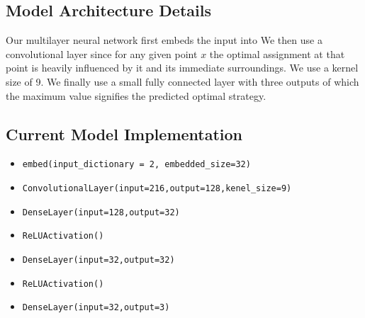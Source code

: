 \documentclass[12pt]{article}
\begin{document}
 \subsection{Model Architecture Details}
 Our multilayer neural network first embeds the input into
 We then use a convolutional layer since for any given point $x$ the optimal assignment at that point is heavily influenced by it and its immediate surroundings. We use a kernel size of 9. We finally use a small fully connected layer with three outputs of which the maximum value signifies the predicted optimal strategy.

 \subsection{Current Model Implementation}
\begin{itemize}
  \item \texttt{embed(input\_dictionary = 2, embedded\_size=32) }
  \item \texttt{ConvolutionalLayer(input=216,output=128,kenel\_size=9)}
  \item \texttt{DenseLayer(input=128,output=32)}
  \item \texttt{ReLUActivation()}
  \item \texttt{DenseLayer(input=32,output=32)}
  \item \texttt{ReLUActivation()}
  \item \texttt{DenseLayer(input=32,output=3)}
\end{itemize}
\end{document}
